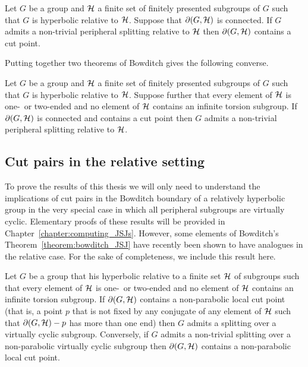 \begin{theorem}\cite[Theorem 1.2]{bowditch01}
  Let $G$ be a group and $\mathcal{H}$ a finite set of finitely presented subgroups of $G$ such that $G$ is hyperbolic relative to $\mathcal{H}$.
  Suppose that $\partial(G, \mathcal{H})$ is connected.
  If $G$ admits a non-trivial peripheral splitting relative to $\mathcal{H}$ then $\partial(G, \mathcal{H})$ contains a cut point.
\end{theorem}

Putting together two theorems of Bowditch gives the following converse.

\begin{theorem}\cite[Theorem 0.2]{bowditch99a}\cite[Theorem 1.2]{bowditch99b}
  \label{theorem:cut_point_implies_splitting}
    Let $G$ be a group and $\mathcal{H}$ a finite set of finitely presented subgroups of $G$ such that $G$ is hyperbolic relative to $\mathcal{H}$.
    Suppose further that every element of $\mathcal{H}$ is one-~or two-ended and no element of $\mathcal{H}$ contains an infinite torsion subgroup.
    If $\partial(G, \mathcal{H})$ is connected and contains a cut point then $G$ admits a non-trivial peripheral splitting relative to $\mathcal{H}$.
\end{theorem}

\subsection{Cut pairs in the relative setting}

To prove the results of this thesis we will only need to understand the implications of cut pairs in the Bowditch boundary of a relatively hyperbolic group in the very special case in which all peripheral subgroups are virtually cyclic. 
Elementary proofs of these results will be provided in Chapter~\ref{chapter:computing_JSJs}.
However, some elements of Bowditch's Theorem~\ref{theorem:bowditch_JSJ} have recently been shown to have analogues in the relative case.
For the sake of completeness, we include this result here.

\begin{theorem}\cite{haulmark17}
  Let $G$ be a group that his hyperbolic relative to a finite set $\mathcal{H}$ of subgroups such that every element of $\mathcal{H}$ is one-~or two-ended and no element of $\mathcal{H}$ contains an infinite torsion subgroup.
  If $\partial(G, \mathcal{H})$ contains a non-parabolic local cut point (that is, a point $p$ that is not fixed by any conjugate of any element of $\mathcal{H}$ such that $\partial(G, \mathcal{H}) - p$ has more than one end) then $G$ admits a splitting over a virtually cyclic subgroup.
  Conversely, if $G$ admits a non-trivial splitting over a non-parabolic virtually cyclic subgroup then $\partial(G, \mathcal{H})$ contains a non-parabolic local cut point.
\end{theorem}

